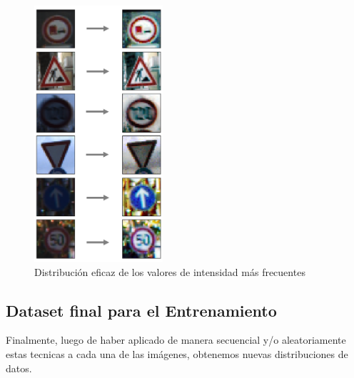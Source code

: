 			\begin{figure}[H]
				\begin{center}
				\includegraphics[height=9.5cm]{images/desarrollo/Augment/equalize_hist2_wo_Norm_woRepetition}
				\end{center}
				\begin{center}
				\caption{\small{Distribución eficaz de los valores de intensidad más frecuentes}}
				{\small{\fontsize{10}{16.8}\selectfont {Fuente: Elaboración propia}}}
				\end{center}
				\vspace{-1.5em}
			\end{figure}
		
		

	\newpage
	\subsection{Dataset final para el Entrenamiento}
		Finalmente, luego de haber aplicado de manera secuencial y/o aleatoriamente estas tecnicas a cada una de las imágenes, obtenemos nuevas distribuciones de datos. 
